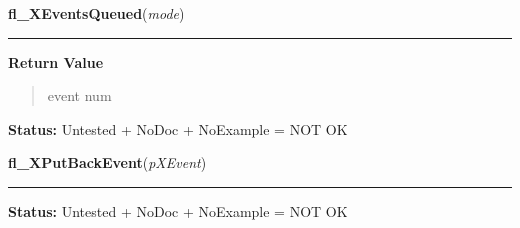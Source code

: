     \label{xformslib:library:fl_XEventsQueued}

    \vspace{0.5ex}

\hspace{.8\funcindent}\begin{boxedminipage}{\funcwidth}

    \raggedright \textbf{fl\_XEventsQueued}(\textit{mode})

    \vspace{-1.5ex}

    \rule{\textwidth}{0.5\fboxrule}
\setlength{\parskip}{2ex}
\setlength{\parskip}{1ex}
      \textbf{Return Value}
    \vspace{-1ex}

      \begin{quote}
      event num

      \end{quote}

\textbf{Status:} Untested + NoDoc + NoExample = NOT OK



    \end{boxedminipage}

    \label{xformslib:library:fl_XPutBackEvent}

    \vspace{0.5ex}

\hspace{.8\funcindent}\begin{boxedminipage}{\funcwidth}

    \raggedright \textbf{fl\_XPutBackEvent}(\textit{pXEvent})

    \vspace{-1.5ex}

    \rule{\textwidth}{0.5\fboxrule}
\setlength{\parskip}{2ex}
\setlength{\parskip}{1ex}
\textbf{Status:} Untested + NoDoc + NoExample = NOT OK



    \end{boxedminipage}

    \label{xformslib:library:fl_last_event}

